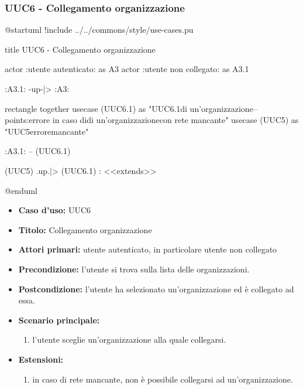 \documentclass[casi-duso]{subfiles}
\begin{document}
\subsubsection{UUC6 - Collegamento organizzazione}%
\label{subsub:UUC6utente}

\begin{plantuml}
@startuml
!include ../../commons/style/use-cases.pu

title UUC6 - Collegamento organizzazione

actor :utente autenticato: as A3
actor :utente non collegato: as A3.1

:A3.1: -up-|> :A3:

rectangle {
  together {
    usecase (UUC6.1) as "UUC6.1\nSelezionamento di un'organizzazione\n--\nExtension points:\nVisualizzazione errore in caso di\nselezionamento di un'organizzazione\n con rete mancante"
    usecase (UUC5) as "UUC5\nVisualizzazione errore\nrete mancante"
  }
}

:A3.1: -- (UUC6.1)

(UUC5) .up.|> (UUC6.1) : <<extends>>

@enduml
\end{plantuml}

\begin{itemize}
  \item \textbf{Caso d’uso:} UUC6
  \item \textbf{Titolo:} Collegamento organizzazione
  \item \textbf{Attori primari:} utente autenticato, in particolare utente non collegato
  \item \textbf{Precondizione:} l'utente si trova sulla lista delle organizzazioni.
  \item \textbf{Postcondizione:} l'utente ha selezionato un'organizzazione ed è collegato ad essa.
  \item \textbf{Scenario principale:}
        \begin{enumerate}
          \item l'utente sceglie un'organizzazione alla quale collegarsi.
        \end{enumerate}
  \item \textbf{Estensioni:}
        \begin{enumerate}
          \item in caso di rete mancante, non è possibile collegarsi ad un'organizzazione.
        \end{enumerate}
\end{itemize}
\end{document}
